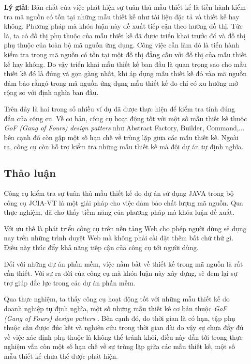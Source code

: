 \documentclass[12pt]{report}
\begin{document}
\noindent \textbf{Lý giải}: Bản chất của việc phát hiện sự tuân thủ mẫu thiết kế là tiền hành kiểm tra mã nguồn có tồn tại những mẫu thiết kế như tài liệu đặc tả và thiết kế hay không. Phương pháp mà khóa luận này đề xuất tiếp cận theo hướng đồ thị. Tức là, ta có đồ thị phụ thuộc của mẫu thiết kế đã được triển khai trước đó và đồ thị phụ thuộc của toàn bộ mã nguồn ứng dụng. Công việc cần làm đó là tiến hành kiểm tra trong mã nguồn có tồn tại một đồ thị đẳng cấu với đồ thị của mẫu thiết kế hay không.
Do vậy triển khai mẫu thiết kế ban đầu là quan trọng sao cho mẫu thiết kế đó là đúng và gọn gàng nhất, khi áp dụng mẫu thiết kế đó vào mã nguồn đảm bảo rằngó trong mã nguồn ứng dụng mẫu thiết kế đo chỉ có xu hướng mở rộng so với định nghĩa ban đầu.

\noindent Trên đây là hai trong số nhiều ví dụ đã được thực hiện để kiểm tra tính đúng đắn của công cụ. Về cơ bản, công cụ hoạt động tốt với một số mẫu thiết kế thuộc \textit{GoF (Gang of Fours) design patters} \cite{go4} như Abstract Factory, Builder, Command,... bên cạnh đó còn gặp một số hạn chế về trùng lặp giữa các mẫu thiết kế.
Ngoài ra, công cụ còn hỗ trợ kiểm tra những mẫu thiết kế mà đội dự án tự định nghĩa. 

\subsection{Thảo luận}
Công cụ kiểm tra sự tuân thủ mẫu thiết kế do dự án sử dụng JAVA trong bộ công cụ JCIA-VT là một giải pháp cho việc đảm bảo chất lượng mã nguồn. Qua thực nghiệm, đã cho thấy tiềm năng của phương pháp mà khóa luận đề xuất.

\noindent Với ưu thế là phát triển công cụ trên nền tảng Web cho phép người dùng sẻ dụng nay trên những trình duyệt Web mà không phải cài đặt thêm bất chứ thứ gì. Điều này thúc đẩy khả năng tiếp cận của công cụ tới người dùng.

\noindent Đối với những dự án phần mềm, việc nắm bắt về thiết kế trong mã nguồn là rất cần thiết. Với sự ra đời của công cụ mà khóa luận này xây dựng, sẽ đem lại sự trợ giúp đắc lực trong các dự án phần mềm.

\noindent Qua thực nghiệm, ta thấy công cụ hoạt động tốt với những mẫu thiết kế do doanh nghiệp tự định nghĩa, một số những mẫu thiết kế cơ bản thuộc \textit{GoF (Gang of Fours) design patters} \cite{go4}. Bên cạnh đó, do thời gian là có hạn, tập phụ thuộc cần được đúc kết và nghiên cứu trong thời gian dài do vậy sự chưa đầy đủ về việc xác định phụ thuộc là không thể tránh khỏi, điều này dẫn tới trong thực nghiệm vẫn còn một số hạn chế về sự trùng lặp giữa các mẫu thiết kế, một số mẫu thiết kế chưa thể được phát hiện.
\end{document}
